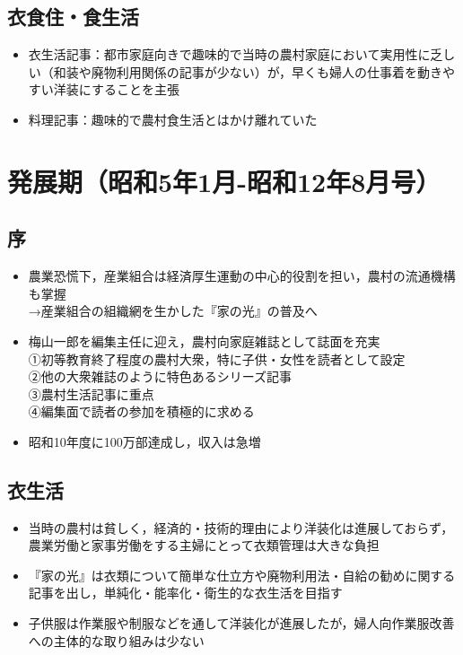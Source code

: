 \documentclass[11pt,autodetect-engine]{jsarticle}%
\begin{document}
 \subsection{衣食住・食生活 }
 
 \begin{itemize}
  \item 衣生活記事：都市家庭向きで趣味的で当時の農村家庭において実用性に乏しい（和装や廃物利用関係の記事が少ない）が，早くも婦人の仕事着を動きやすい洋装にすることを主張
  \item 料理記事：趣味的で農村食生活とはかけ離れていた
\end{itemize}

\section{発展期（昭和5年1月-昭和12年8月号） }

 \subsection{序 }
 
 \begin{itemize}
  \item 農業恐慌下，産業組合は経済厚生運動の中心的役割を担い，農村の流通機構も掌握
  \\→産業組合の組織網を生かした『家の光』の普及へ
  \item 梅山一郎を編集主任に迎え，農村向家庭雑誌として誌面を充実
  \\①初等教育終了程度の農村大衆，特に子供・女性を読者として設定
  \\②他の大衆雑誌のように特色あるシリーズ記事
  \\③農村生活記事に重点
  \\④編集面で読者の参加を積極的に求める
  \item 昭和10年度に100万部達成し，収入は急増
\end{itemize}

 \subsection{衣生活 }
 
 \begin{itemize}
  \item 当時の農村は貧しく，経済的・技術的理由により洋装化は進展しておらず，農業労働と家事労働をする主婦にとって衣類管理は大きな負担
  \item 『家の光』は衣類について簡単な仕立方や廃物利用法・自給の勧めに関する記事を出し，単純化・能率化・衛生的な衣生活を目指す
  \item 子供服は作業服や制服などを通して洋装化が進展したが，婦人向作業服改善への主体的な取り組みは少ない
\end{itemize}
\end{document}
